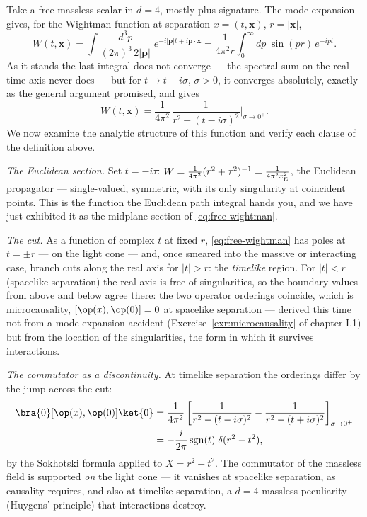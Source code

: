 \begin{eexample}
\label{ex:free-scalar-2pt}
Take a free massless scalar in $d = 4$, mostly-plus signature. The mode
expansion gives, for the Wightman function at separation $x = (t, \mathbf{x})$,
$r = |\mathbf{x}|$,
\begin{equation}
W(t, \mathbf{x}) = \int \frac{d^3p}{(2\pi)^3\, 2|\mathbf{p}|}\;
  e^{-i|\mathbf{p}| t + i \mathbf{p} \cdot \mathbf{x}}
= \frac{1}{4\pi^2 r} \int_0^\infty dp\; \sin(pr)\, e^{-ipt} .
\end{equation}
As it stands the last integral does not converge --- the spectral sum on the
real-time axis never does --- but for $t \to t - i\sigma$, $\sigma > 0$, it
converges absolutely, exactly as the general argument promised, and gives
\begin{equation}
W(t, \mathbf{x}) = \frac{1}{4\pi^2}\,
\frac{1}{r^2 - (t - i\sigma)^2}\bigg|_{\sigma \to 0^+}.
\label{eq:free-wightman}
\end{equation}
We now examine the analytic structure of this function and verify each
clause of the definition above.

\emph{The Euclidean section.} Set $t = -i\tau$: $W = \frac{1}{4\pi^2}(r^2 +
\tau^2)^{-1} = \frac{1}{4\pi^2 x_{\rm E}^2}$, the Euclidean propagator ---
single-valued, symmetric, with its only singularity at coincident points. This
is the function the Euclidean path integral hands you, and we have just
exhibited it as the midplane section of \eqref{eq:free-wightman}.

\emph{The cut.} As a function of complex $t$ at fixed $r$,
\eqref{eq:free-wightman} has poles at $t = \pm r$ --- on the light cone ---
and, once smeared into the massive or interacting case, branch cuts along the
real axis for $|t| > r$: the \emph{timelike} region. For $|t| < r$ (spacelike
separation) the real axis is free of singularities, so the boundary values from
above and below agree there: the two operator orderings coincide, which is
microcausality, $[\op(x), \op(0)] = 0$ at spacelike separation --- derived this
time not from a mode-expansion accident (Exercise~\ref{exr:microcausality} of
chapter I.1) but from the location of the singularities, the form in which it
survives interactions.

\emph{The commutator as a discontinuity.} At timelike separation the orderings
differ by the jump across the cut:
\begin{align}
\bra{0}[\op(x), \op(0)]\ket{0}
&= \frac{1}{4\pi^2}\left[\frac{1}{r^2 - (t-i\sigma)^2}
 - \frac{1}{r^2 - (t+i\sigma)^2}\right]_{\sigma\to 0^+} \nonumber\\
&= -\frac{i}{2\pi}\,\mathrm{sgn}(t)\;\delta(r^2 - t^2),
\label{eq:pauli-jordan}
\end{align}
by the Sokhotski formula applied to $X = r^2 - t^2$. The commutator of the
massless field is supported \emph{on} the light cone --- it vanishes at
spacelike separation, as causality requires, and also at timelike separation,
a $d=4$ massless peculiarity (Huygens' principle) that interactions destroy.


\end{eexample}
